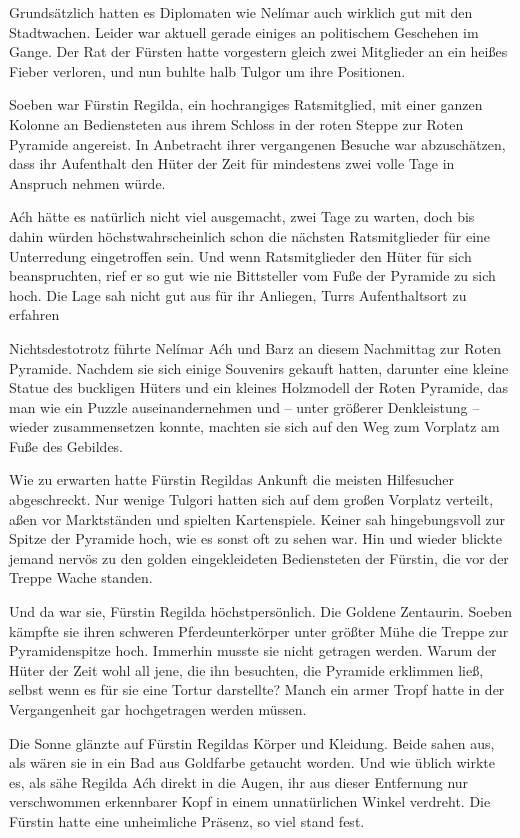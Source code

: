 Grundsätzlich hatten es Diplomaten wie Nelímar auch wirklich gut mit den Stadtwachen. Leider war aktuell gerade einiges an politischem Geschehen im Gange. Der Rat der Fürsten hatte vorgestern gleich zwei Mitglieder an ein heißes Fieber verloren, und nun buhlte halb Tulgor um ihre Positionen.

Soeben war Fürstin Regilda, ein hochrangiges Ratsmitglied, mit einer ganzen Kolonne an Bediensteten aus ihrem Schloss in der roten Steppe zur Roten Pyramide angereist. In Anbetracht ihrer vergangenen Besuche war abzuschätzen, dass ihr Aufenthalt den Hüter der Zeit für mindestens zwei volle Tage in Anspruch nehmen würde.

Aćh hätte es natürlich nicht viel ausgemacht, zwei Tage zu warten, doch bis dahin würden höchstwahrscheinlich schon die nächsten Ratsmitglieder für eine Unterredung eingetroffen sein. Und wenn Ratsmitglieder den Hüter für sich beanspruchten, rief er so gut wie nie Bittsteller vom Fuße der Pyramide zu sich hoch. Die Lage sah nicht gut aus für ihr Anliegen, Turrs Aufenthaltsort zu erfahren

Nichtsdestotrotz führte Nelímar Aćh und Barz an diesem Nachmittag zur Roten Pyramide. Nachdem sie sich einige Souvenirs gekauft hatten, darunter eine kleine Statue des buckligen Hüters und ein kleines Holzmodell der Roten Pyramide, das man wie ein Puzzle auseinandernehmen und – unter größerer Denkleistung – wieder zusammensetzen konnte, machten sie sich auf den Weg zum Vorplatz am Fuße des Gebildes.

Wie zu erwarten hatte Fürstin Regildas Ankunft die meisten Hilfesucher abgeschreckt. Nur wenige Tulgori hatten sich auf dem großen Vorplatz verteilt, aßen vor Marktständen und spielten Kartenspiele. Keiner sah hingebungsvoll zur Spitze der Pyramide hoch, wie es sonst oft zu sehen war. Hin und wieder blickte jemand nervös zu den golden eingekleideten Bediensteten der Fürstin, die vor der Treppe Wache standen.

Und da war sie, Fürstin Regilda höchstpersönlich. Die Goldene Zentaurin. Soeben kämpfte sie ihren schweren Pferdeunterkörper unter größter Mühe die Treppe zur Pyramidenspitze hoch. Immerhin musste sie nicht getragen werden. Warum der Hüter der Zeit wohl all jene, die ihn besuchten, die Pyramide erklimmen ließ, selbst wenn es für sie eine Tortur darstellte? Manch ein armer Tropf hatte in der Vergangenheit gar hochgetragen werden müssen.

Die Sonne glänzte auf Fürstin Regildas Körper und Kleidung. Beide sahen aus, als wären sie in ein Bad aus Goldfarbe getaucht worden. Und wie üblich wirkte es, als sähe Regilda Aćh direkt in die Augen, ihr aus dieser Entfernung nur verschwommen erkennbarer Kopf in einem unnatürlichen Winkel verdreht. Die Fürstin hatte eine unheimliche Präsenz, so viel stand fest.

